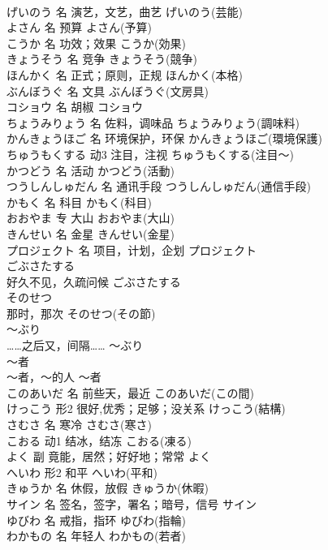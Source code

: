 \documentclass[8pt]{extreport}
\begin{document}
\begin{CJK}{UTF8}{min}
\\	げいのう	名	演艺，文艺，曲艺	げいのう(芸能)	
\\	よさん	名	预算	よさん(予算)	
\\	こうか	名	功效；效果	こうか(効果)	
\\	きょうそう	名	竞争	きょうそう(競争)	
\\	ほんかく	名	正式；原则，正规	ほんかく(本格)	
\\	ぶんぼうぐ	名	文具	ぶんぼうぐ(文房具)	
\\	コショウ	名	胡椒	コショウ	
\\	ちょうみりょう	名	佐料，调味品	ちょうみりょう(調味料)	
\\	かんきょうほご	名	环境保护，环保	かんきょうほご(環境保護)	
\\	ちゅうもくする	动3	注目，注视	ちゅうもくする(注目～)	
\\	かつどう	名	活动	かつどう(活動)	
\\	つうしんしゅだん	名	通讯手段	つうしんしゅだん(通信手段)	
\\	かもく	名	科目	かもく(科目)	
\\	おおやま	专	大山	おおやま(大山)	
\\	きんせい	名	金星	きんせい(金星)	
\\	プロジェクト	名	项目，计划，企划	プロジェクト	
\\	ごぶさたする	
\\	好久不见，久疏问候	ごぶさたする	
\\	そのせつ	
\\	那时，那次	そのせつ(その節)	
\\	～ぶり	
\\	……之后又，间隔……	～ぶり	
\\	～者	
\\	～者，～的人	～者	
\\	このあいだ	名	前些天，最近	このあいだ(この間)	
\\	けっこう	形2	很好,优秀；足够；没关系	けっこう(結構)	
\\	さむさ	名	寒冷	さむさ(寒さ)	
\\	こおる	动1	结冰，结冻	こおる(凍る)	
\\	よく	副	竟能，居然；好好地；常常	よく	
\\	へいわ	形2	和平	へいわ(平和)	
\\	きゅうか	名	休假，放假	きゅうか(休暇)	
\\	サイン	名	签名，签字，署名；暗号，信号	サイン	
\\	ゆびわ	名	戒指，指环	ゆびわ(指輪)	
\\	わかもの	名	年轻人	わかもの(若者)	

\end{CJK}
\end{document}
